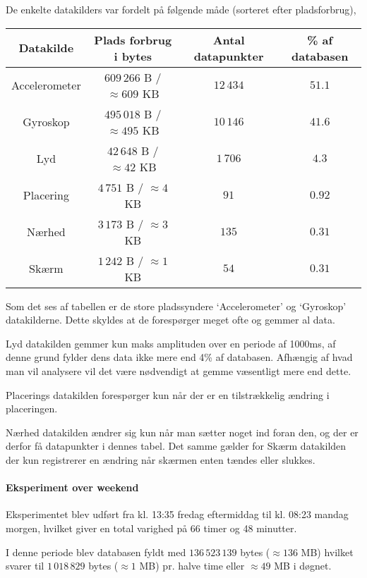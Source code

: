 De enkelte datakilders var fordelt på følgende måde (sorteret efter pladsforbrug),

\begin{tabular}{|c|c|c|c|}
	\hline Datakilde		& Plads forbrug i bytes				& Antal datapunkter  & \% af databasen \\
	\hline Accelerometer 	& $609\,266$ B / $\approx609$ KB	& $12\,434$ 		 & $51.1$ \\ 
	\hline Gyroskop 		& $495\,018$ B / $\approx495$ KB	& $10\,146$ 		 & $41.6$\\ 
	\hline Lyd 				& $42\,648$ B / $\approx42$ KB		& $1\,706$ 			 & $4.3$ \\ 
	\hline Placering 		& $4\,751$ B / $\approx4$ KB		& $91$ 				 & $0.92$ \\ 
	\hline Nærhed    		& $3\,173$ B / $\approx3$ KB		& $135$ 			 & $0.31$ \\ 
	\hline Skærm 			& $1\,242$ B / $\approx1$	KB		& $54$				 & $0.31$ \\ 
	\hline 
\end{tabular} 

Som det ses af tabellen er de store pladssyndere `Accelerometer' og `Gyroskop' datakilderne.
Dette skyldes at de forespørger meget ofte og gemmer al data.

Lyd datakilden gemmer kun maks amplituden over en periode af 1000ms, af denne grund fylder dens data ikke mere end 4\% af databasen.
Afhængig af hvad man vil analysere vil det være nødvendigt at gemme væsentligt mere end dette.

Placerings datakilden forespørger kun når der er en tilstrækkelig ændring i placeringen.

Nærhed datakilden ændrer sig kun når man sætter noget ind foran den, og der er derfor få datapunkter i dennes tabel.
Det samme gælder for Skærm datakilden der kun registrerer en ændring når skærmen enten tændes eller slukkes.	

\paragraph{Eksperiment over weekend}
Eksperimentet blev udført fra kl. 13:35 fredag eftermiddag til kl. 08:23 mandag morgen, hvilket giver en total varighed på 66 timer og 48 minutter.

I denne periode blev databasen fyldt med  $136\,523\,139$ bytes ($\approx136$ MB) hvilket svarer til $1\,018\,829$ bytes ($\approx1$ MB) pr. halve time eller $\approx49$ MB i døgnet.

